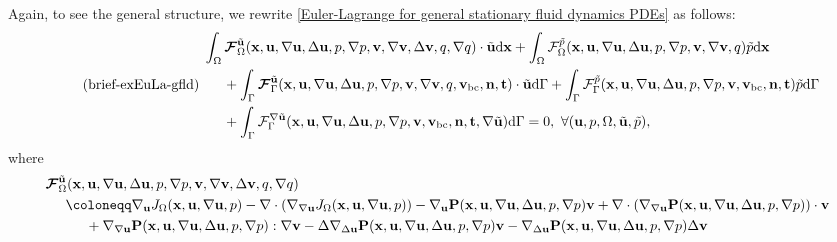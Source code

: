 \documentclass[oneside,11pt]{book}
\numberwithin{equation}{section}
\begin{document}
\begin{itemize}[leftmargin=0in]
    Again, to see the general structure, we rewrite \eqref{Euler-Lagrange for general stationary fluid dynamics PDEs} as follows:
    \begin{equation}
        \label{brief extended Euler-Lagrange for general stationary fluid dynamics PDEs}
        \tag{brief-exEuLa-gfld}
        \left.\begin{split}
            &\int_\Omega \boldsymbol{\mathcal{F}}_\Omega^{\tilde{\bf u}}({\bf x},{\bf u},\nabla{\bf u},\Delta{\bf u},p,\nabla p,{\bf v},\nabla{\bf v},\Delta{\bf v},q,\nabla q)\cdot\tilde{\bf u}{\rm d}{\bf x} + \int_\Omega \mathcal{F}_\Omega^{\tilde{p}}({\bf x},{\bf u},\nabla{\bf u},\Delta{\bf u},p,\nabla p,{\bf v},\nabla{\bf v},q)\tilde{p}{\rm d}{\bf x}\\
            &\hspace{5mm}+ \int_\Gamma \boldsymbol{\mathcal{F}}_\Gamma^{\tilde{\bf u}}({\bf x},{\bf u},\nabla{\bf u},\Delta{\bf u},p,\nabla p,{\bf v},\nabla{\bf v},q,{\bf v}_{\rm bc},{\bf n},{\bf t})\cdot\tilde{\bf u}{\rm d}\Gamma + \int_\Gamma \mathcal{F}_\Gamma^{\tilde{p}}({\bf x},{\bf u},\nabla{\bf u},\Delta{\bf u},p,\nabla p,{\bf v},{\bf v}_{\rm bc},{\bf n},{\bf t})\tilde{p}{\rm d}\Gamma\\
            &\hspace{5mm}+ \int_\Gamma \mathcal{F}_\Gamma^{\nabla\tilde{\bf u}}({\bf x},{\bf u},\nabla{\bf u},\Delta{\bf u},p,\nabla p,{\bf v},{\bf v}_{\rm bc},{\bf n},{\bf t},\nabla\tilde{\bf u}){\rm d}\Gamma = 0,\ \forall({\bf u},p,\Omega,\tilde{\bf u},\tilde{p}),
        \end{split}\right.
    \end{equation}
    where
    \begin{align*}
        &\boldsymbol{\mathcal{F}}_\Omega^{\tilde{\bf u}}({\bf x},{\bf u},\nabla{\bf u},\Delta{\bf u},p,\nabla p,{\bf v},\nabla{\bf v},\Delta{\bf v},q,\nabla q)\\
        &\hspace{5mm}\coloneqq\nabla_{\bf u}J_\Omega({\bf x},{\bf u},\nabla{\bf u},p) - \nabla\cdot\left(\nabla_{\nabla{\bf u}}J_\Omega({\bf x},{\bf u},\nabla{\bf u},p)\right) - \nabla_{\bf u}{\bf P}({\bf x},{\bf u},\nabla{\bf u},\Delta{\bf u},p,\nabla p){\bf v} + \nabla\cdot\left(\nabla_{\nabla{\bf u}}{\bf P}({\bf x},{\bf u},\nabla{\bf u},\Delta{\bf u},p,\nabla p)\right)\cdot{\bf v}\\
        &\hspace{1cm}+ \nabla_{\nabla{\bf u}}{\bf P}({\bf x},{\bf u},\nabla{\bf u},\Delta{\bf u},p,\nabla p):\nabla{\bf v} - \Delta\nabla_{\Delta{\bf u}}{\bf P}({\bf x},{\bf u},\nabla{\bf u},\Delta{\bf u},p,\nabla p){\bf v} - \nabla_{\Delta{\bf u}}{\bf P}({\bf x},{\bf u},\nabla{\bf u},\Delta{\bf u},p,\nabla p)\Delta{\bf v}\\

\end{align*}
\end{itemize}
\end{document}
